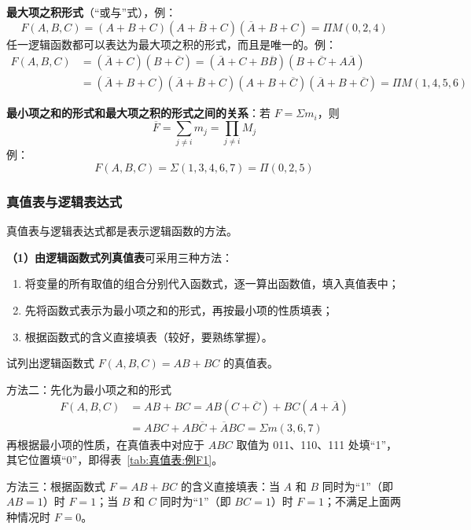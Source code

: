 \textbf{最大项之积形式}（“或与”式），例：
\begin{equation}
	F(A,B,C)=(A+B+C)(A+\overline{B}+C)(\overline{A}+B+C)=\Pi M(0,2,4)
	\label{eq:标准:最大项之积例}
\end{equation}
任一逻辑函数都可以表达为最大项之积的形式，而且是唯一的。例：
\begin{equation}
	\begin{aligned}
		F(A,B,C)&=(\overline{A}+C)(B+\overline{C})=(\overline{A}+C+B\overline{B})(B+\overline{C}+A\overline{A})\\
		&=(\overline{A}+B+C)(\overline{A}+\overline{B}+C)(A+B+\overline{C})(\overline{A}+B+\overline{C})=\Pi M(1,4,5,6)
	\end{aligned}
	\label{eq:标准:最大项之积例2}
\end{equation}

\textbf{最小项之和的形式和最大项之积的形式之间的关系}：若 $F=\Sigma m_i$，则
\begin{equation}
	\overline{F}=\sum_{j\neq i}m_j=\prod_{j\neq i}M_j
	\label{eq:标准:两种形式关系}
\end{equation}
例：
\begin{equation}
	F(A,B,C)=\Sigma(1,3,4,6,7)=\Pi(0,2,5)
	\label{eq:标准:两种形式关系例}
\end{equation}

\subsubsection{真值表与逻辑表达式}

真值表与逻辑表达式都是表示逻辑函数的方法。

\textbf{（1）由逻辑函数式列真值表}可采用三种方法：
\begin{enumerate}
	\item 将变量的所有取值的组合分别代入函数式，逐一算出函数值，填入真值表中；
	\item 先将函数式表示为最小项之和的形式，再按最小项的性质填表；
	\item 根据函数式的含义直接填表（较好，要熟练掌握）。
\end{enumerate}

\begin{example}[由逻辑函数式列真值表]
\label{ex:列真值表}
试列出逻辑函数式 $F(A,B,C)=AB+BC$ 的真值表。

\begin{solution}
	方法二：先化为最小项之和的形式
	\begin{equation}
		\begin{aligned}
			F(A,B,C)&=AB+BC=AB(C+\overline{C})+BC(A+\overline{A})\\
			&=ABC+AB\overline{C}+\overline{A}BC=\Sigma m(3,6,7)
		\end{aligned}
		\label{eq:真值表:最小项展开}
	\end{equation}
	再根据最小项的性质，在真值表中对应于 $ABC$ 取值为 011、110、111 处填“1”，其它位置填“0”，即得表~\ref{tab:真值表:例F1}。

	方法三：根据函数式 $F=AB+BC$ 的含义直接填表：当 $A$ 和 $B$ 同时为“1”（即 $AB=1$）时 $F=1$；当 $B$ 和 $C$ 同时为“1”（即 $BC=1$）时 $F=1$；不满足上面两种情况时 $F=0$。
\end{solution}
\end{example}

